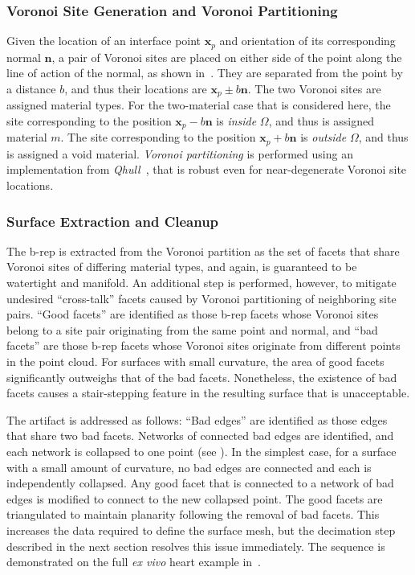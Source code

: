 \subsubsection{Voronoi Site Generation and Voronoi Partitioning}

Given the location of an interface point $\bm{x}_p$ and orientation of its corresponding normal $\bm{n}$, a pair of Voronoi sites are placed on either side of the point along the line of action of the normal, as shown in~. They are separated from the point by a distance $b$, and thus their locations are $\bm{x}_p \pm b \bm{n}$. The two Voronoi sites are assigned material types. For the two-material case that is considered here, the site corresponding to the position $\bm{x}_p - b\bm{n}$ is \textit{inside} $\Omega$, and thus is assigned material $m$. The site corresponding to the position $\bm{x}_p + b\bm{n}$ is \textit{outside} $\Omega$, and thus is assigned a void material. \textit{Voronoi partitioning} is performed using an implementation from \textit{Qhull}~\cite{barber_1996}, that is robust even for near-degenerate Voronoi site locations.

\subsubsection{Surface Extraction and Cleanup}

The b-rep is extracted from the Voronoi partition as the set of facets that share Voronoi sites of differing material types, and again, is guaranteed to be watertight and manifold. An additional step is performed, however, to mitigate undesired ``cross-talk'' facets caused by Voronoi partitioning of neighboring site pairs. ``Good facets'' are identified as those b-rep facets whose Voronoi sites belong to a site pair originating from the same point and normal, and ``bad facets'' are those b-rep facets whose Voronoi sites originate from different points in the point cloud. For surfaces with small curvature, the area of good facets significantly outweighs that of the bad facets. Nonetheless, the existence of bad facets causes a stair-stepping feature in the resulting surface that is unacceptable.

The artifact is addressed as follows: ``Bad edges'' are identified as those edges that share two bad facets. Networks of connected bad edges are identified, and each network is collapsed to one point (see ). In the simplest case, for a surface with a small amount of curvature, no bad edges are connected and each is independently collapsed. Any good facet that is connected to a network of bad edges is modified to connect to the new collapsed point. The good facets are triangulated to maintain planarity following the removal of bad facets. This increases the data required to define the surface mesh, but the decimation step described in the next section resolves this issue immediately. The sequence is demonstrated on the full \textit{ex vivo} heart example in~.

